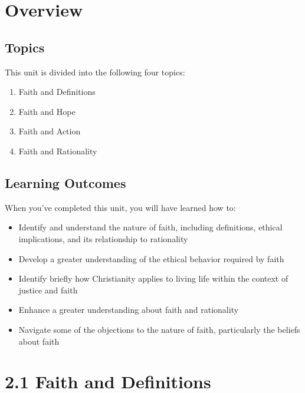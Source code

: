 \documentclass[
]{book}
\providecommand{\tightlist}{%
  \setlength{\itemsep}{0pt}\setlength{\parskip}{0pt}}
\begin{document}
\hypertarget{overview-1}{%
\section*{Overview}\label{overview-1}}

\hypertarget{topics-1}{%
\subsection*{Topics}\label{topics-1}}

This unit is divided into the following four topics:

\begin{enumerate}
\def\labelenumi{\arabic{enumi}.}
\tightlist
\item
  Faith and Definitions
\item
  Faith and Hope
\item
  Faith and Action
\item
  Faith and Rationality
\end{enumerate}

\hypertarget{learning-outcomes-1}{%
\subsection*{Learning Outcomes}\label{learning-outcomes-1}}

When you've completed this unit, you will have learned how to:

\begin{itemize}
\tightlist
\item
  Identify and understand the nature of faith, including definitions, ethical implications, and its relationship to rationality
\item
  Develop a greater understanding of the ethical behavior required by faith
\item
  Identify briefly how Christianity applies to living life within the context of justice and faith
\item
  Enhance a greater understanding about faith and rationality
\item
  Navigate some of the objections to the nature of faith, particularly the beliefs about faith
\end{itemize}

\hypertarget{faith-and-definitions}{%
\section*{2.1 Faith and Definitions}\label{faith-and-definitions}}
\end{document}
